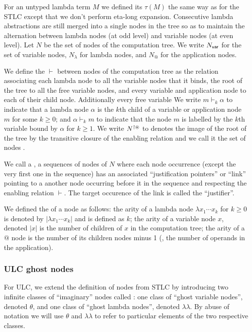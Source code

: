 \documentclass{article}
\theoremstyle{definition}
\newcommand\Nodes{N}%
\newcommand\NodesVar{N_{\sf var}}%
\newcommand\NodesLmd{N_\lambda}%
\newcommand{\ghostlmd}{{\lambda\!\!\lambda}}
\newcommand{\ghostvar}{\theta}
\newcommand{\NodeHjByRoot}{\Nodes^{\filter\theroot}}
\newcommand{\enables}{\vdash}
\begin{document}
For an untyped lambda term $M$ we defined its  $\tau(M)$ the same way as for the STLC
except that we don't perform eta-long expansion. Consecutive lambda abstractions are still merged into a single nodes in the tree so as to maintain the alternation between lambda nodes (at odd level) and variable nodes (at even level).
Let $\Nodes$ be the set of nodes of the computation tree. We write $\NodesVar$ for the set of variable nodes, $\NodesLmd$ for lambda nodes, and $\Nodes_{@}$ for the application nodes.

We define the  $\enables$ between nodes of the computation tree as the relation associating each lambda node to all the variable nodes that it binds, the root of the tree to all the free variable nodes, and every variable and application node to each of their child node. Additionally every free variable  We write $m \enables_k \alpha$ to indicate that a lambda node $\alpha$ is the $k$th child of a variable or application node $m$ for some $k\geq0$; and $\alpha \enables_k m$ to indicate that the node $m$ is labelled by the $k$th variable bound by $\alpha$ for $k\geq1$. We write $\NodeHjByRoot$ to denotes the image of the root of the tree by the transitive closure of the enabling relation and we call it the set of nodes .

We call a , a sequences of nodes of $\Nodes$ where each node occurrence (except the very first one in the sequence) has an associated ``justification pointers'' or ``link'' pointing to a another node occurring before it in the sequence and respecting the enabling relation $\enables$. The target occurence of the link is called the ``justifier''.

We defined the  of a node as follows: the arity of a lambda node $\lambda x_1 \cdots x_k$ for $k\geq 0$ is denoted by $|\lambda x_1 \cdots x_k|$ and is defined as $k$; the arity of a variable node $x$, denoted $|x|$ is the number of children of $x$ in the computation tree; the arity of a $@$ node is the number of its children nodes minus 1 (\ie, the number of operands in the application).

\subsubsection{ULC ghost nodes}
For ULC, we extend the definition of nodes from STLC by introducing two infinite classes of ``imaginary'' nodes called :
one class of ``ghost variable nodes'', denoted $\ghostvar$, and one class of ``ghost lambda nodes'', denoted $\ghostlmd$. By abuse of notation we will use $\ghostvar$ and $\ghostlmd$ to refer to particular elements of the two respective classes.
\end{document}
